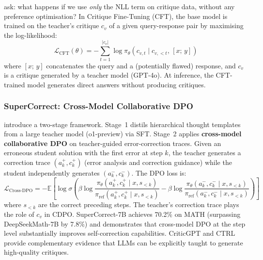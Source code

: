 \documentclass[11pt]{article}
\begin{document}
\autocite{wang2025critiquefinetuninglearningcritique} ask: what happens if we use \emph{only} the NLL term on critique data, without any preference optimisation? In Critique Fine-Tuning (CFT), the base model is trained on the teacher's critique $c_v$ of a given query-response pair by maximising the log-likelihood:
\begin{equation}
    \mathcal{L}_{\text{CFT}}(\theta) = -\sum_{t=1}^{|c_v|} \log \pi_\theta(c_{v,t} \mid c_{v,<t},\, [x;\, y])
    \label{eq:cft}
\end{equation}
where $[x;\, y]$ concatenates the query and a (potentially flawed) response, and $c_v$ is a critique generated by a teacher model (GPT-4o). At inference, the CFT-trained model generates direct answers without producing critiques.

\subsubsection{SuperCorrect: Cross-Model Collaborative DPO}

\autocite{yang2024supercorrect} introduce a two-stage framework. Stage~1 distils hierarchical thought templates from a large teacher model (o1-preview) via SFT. Stage~2 applies \textbf{cross-model collaborative DPO} on teacher-guided error-correction traces. Given an erroneous student solution with the first error at step $k$, the teacher generates a correction trace $(a_k^+, c_k^+)$ (error analysis and correction guidance) while the student independently generates $(a_k^-, c_k^-)$. The DPO loss is:
\begin{equation}
    \mathcal{L}_{\text{Cross-DPO}} = -\mathbb{E}\!\left[\log\sigma\!\left(\beta\log\frac{\pi_\theta(a_k^+, c_k^+ \mid x, s_{<k})}{\pi_{\text{ref}}(a_k^+, c_k^+ \mid x, s_{<k})} - \beta\log\frac{\pi_\theta(a_k^-, c_k^- \mid x, s_{<k})}{\pi_{\text{ref}}(a_k^-, c_k^- \mid x, s_{<k})}\right)\right]
    \label{eq:supercorrect}
\end{equation}
where $s_{<k}$ are the correct preceding steps. The teacher's correction trace plays the role of $c_v$ in CDPO. SuperCorrect-7B achieves 70.2\% on MATH (surpassing DeepSeekMath-7B by 7.8\%) and demonstrates that cross-model DPO at the step level substantially improves self-correction capabilities. CriticGPT \autocite{mcaleese2024llmcriticshelpllm} and CTRL \autocite{xie2025teachinglanguagemodelscritique} provide complementary evidence that LLMs can be explicitly taught to generate high-quality critiques.

\end{document}
